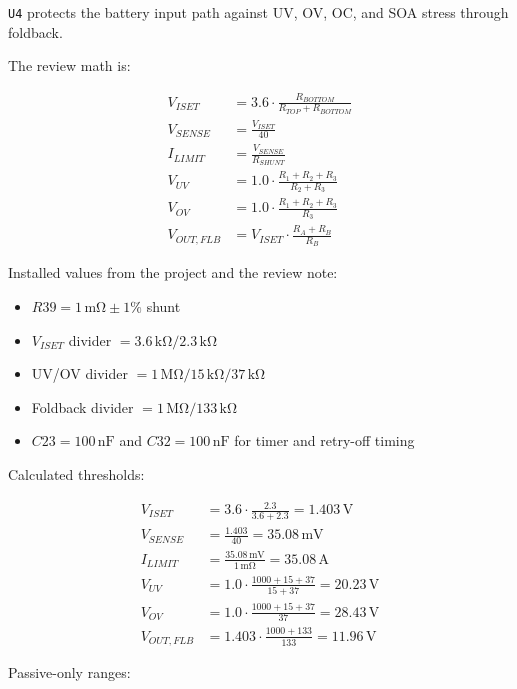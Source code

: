 \documentclass[11pt,a4paper]{article}
\begin{document}
\texttt{U4} protects the battery input path against UV, OV, OC, and SOA stress through foldback.

The review math is:

\begin{align}
V_{ISET} &= 3.6 \cdot \frac{R_{BOTTOM}}{R_{TOP} + R_{BOTTOM}} \\
V_{SENSE} &= \frac{V_{ISET}}{40} \\
I_{LIMIT} &= \frac{V_{SENSE}}{R_{SHUNT}} \\
V_{UV} &= 1.0 \cdot \frac{R_1 + R_2 + R_3}{R_2 + R_3} \\
V_{OV} &= 1.0 \cdot \frac{R_1 + R_2 + R_3}{R_3} \\
V_{OUT,FLB} &= V_{ISET} \cdot \frac{R_A + R_B}{R_B}
\end{align}

Installed values from the project and the review note:

\begin{itemize}
\item $R39 = 1\,\mathrm{m\Omega} \pm 1\%$ shunt
\item $V_{ISET}$ divider $= 3.6\,\mathrm{k\Omega} / 2.3\,\mathrm{k\Omega}$
\item UV/OV divider $= 1\,\mathrm{M\Omega} / 15\,\mathrm{k\Omega} / 37\,\mathrm{k\Omega}$
\item Foldback divider $= 1\,\mathrm{M\Omega} / 133\,\mathrm{k\Omega}$
\item $C23 = 100\,\mathrm{nF}$ and $C32 = 100\,\mathrm{nF}$ for timer and retry-off timing
\end{itemize}

Calculated thresholds:

\begin{align*}
V_{ISET} &= 3.6 \cdot \frac{2.3}{3.6 + 2.3} = 1.403\,\mathrm{V} \\
V_{SENSE} &= \frac{1.403}{40} = 35.08\,\mathrm{mV} \\
I_{LIMIT} &= \frac{35.08\,\mathrm{mV}}{1\,\mathrm{m\Omega}} = 35.08\,\mathrm{A} \\
V_{UV} &= 1.0 \cdot \frac{1000 + 15 + 37}{15 + 37} = 20.23\,\mathrm{V} \\
V_{OV} &= 1.0 \cdot \frac{1000 + 15 + 37}{37} = 28.43\,\mathrm{V} \\
V_{OUT,FLB} &= 1.403 \cdot \frac{1000 + 133}{133} = 11.96\,\mathrm{V}
\end{align*}

Passive-only ranges:
\end{document}
